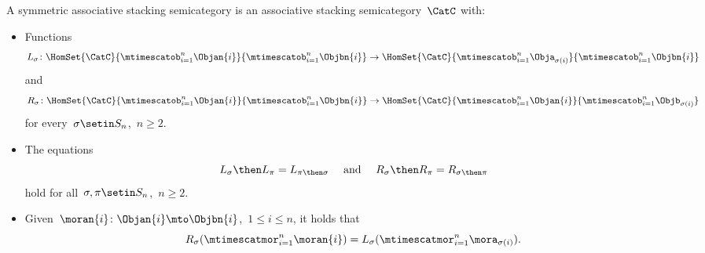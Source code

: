 \begin{ctdefinition}
    \label{def:symmetric-stacking-category}
    A symmetric associative stacking semicategory is an associative stacking semicategory~$\CatC$ with:

    \constit

    \begin{itemize}
        \item Functions
              \begin{equation}
                  L_\sigma \colon \HomSet{\CatC}{\mtimescatob_{i=1}^n \Objan{i}}{\mtimescatob_{i=1}^n \Objbn{i}} \to \HomSet{\CatC}{\mtimescatob_{i=1}^n \Obja_{\sigma(i)}}{\mtimescatob_{i=1}^n \Objbn{i}}
              \end{equation}
              and
              \begin{equation}
                  R_\sigma \colon \HomSet{\CatC}{\mtimescatob_{i=1}^n \Objan{i}}{\mtimescatob_{i=1}^n \Objbn{i}} \to \HomSet{\CatC}{\mtimescatob_{i=1}^n \Objan{i}}{\mtimescatob_{i=1}^n \Objb_{\sigma(i)}}
              \end{equation}
              for every~$\sigma \setin S_n$,~$n \geq 2$.
    \end{itemize}

    \condit

    \begin{itemize}
        \item The equations
              \begin{equation}
                  L_\sigma \then L_\pi = L_{\pi \then \sigma}
                  \quad \text{ and } \quad
                  R_\sigma \then R_\pi = R_{\sigma \then \pi}
              \end{equation}
              hold for all~$\sigma, \pi \setin S_n$,~$n \geq 2$.
        \item
              Given~$\moran{i} \colon \Objan{i} \mto \Objbn{i}$,~$1 \leq i \leq n$, it holds that
              \begin{equation}
                  R_\sigma ( \mtimescatmor_{i=1}^n \moran{i} ) = L_\sigma(  \mtimescatmor_{i=1}^n \mora_{\sigma(i)} ).
              \end{equation}

    \end{itemize}
\end{ctdefinition}


